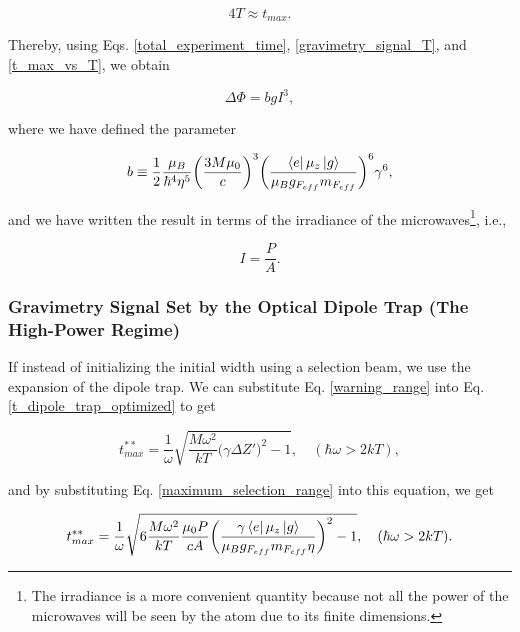 \documentclass{article}
\begin{document}
\begin{equation}\label{t_max_vs_T}
    4T \approx t_{max}.
\end{equation}

Thereby, using Eqs. \ref{total_experiment_time}, \ref{gravimetry_signal_T}, and \ref{t_max_vs_T}, we obtain

\begin{equation}\label{gravimetry_signal_irradiance}
    \Delta \Phi = b g I^3, 
\end{equation}

where we have defined the parameter

\begin{equation}
    b \equiv \frac{1}{2} \frac{ \mu_{B}}{ \hbar^{4} \eta^{5}} \bigg(\frac{3M \mu_{0}}{c} \bigg)^{3} \bigg(\frac{\bra{e} \mu_{z} \ket{g}}{\mu_{B} g_{F_{eff}} m_{F_{eff}}} \bigg)^{6} \gamma^6,
\end{equation}

and we have written the result in terms of the irradiance of the microwaves\footnote{The irradiance is a more convenient quantity because not all the power of the microwaves will be seen by the atom due to its finite dimensions.}, i.e.,

\begin{equation}
    I = \frac{P}{A}.
\end{equation}

\subsubsection{Gravimetry Signal Set by the Optical Dipole Trap (The High-Power Regime)}
If instead of initializing the initial width using a selection beam, we use the expansion of the dipole trap. We can substitute Eq. \ref{warning_range} into Eq. \ref{t_dipole_trap_optimized} to get

\begin{equation}
        t^{**}_{max} = \frac{1}{\omega} \sqrt{\frac{M \omega^{2}}{kT} \bigg( \gamma \Delta Z' \bigg)^{2} - 1}, \quad (\hbar \omega > 2kT),
\end{equation}

and by substituting Eq. \ref{maximum_selection_range} into this equation, we get

\begin{equation}
        t^{**}_{max} = \frac{1}{\omega} \sqrt{6 \frac{M \omega^{2}}{kT} \frac{\mu_{0} P}{ c A} \bigg(\frac{ \gamma  \bra{e} \mu_{z} \ket{g}}{\mu_{B} g_{F_{eff}} m_{F_{eff}} \eta}\bigg)^{2} - 1}, \quad (\hbar \omega > 2kT).
\end{equation}
\end{document}
